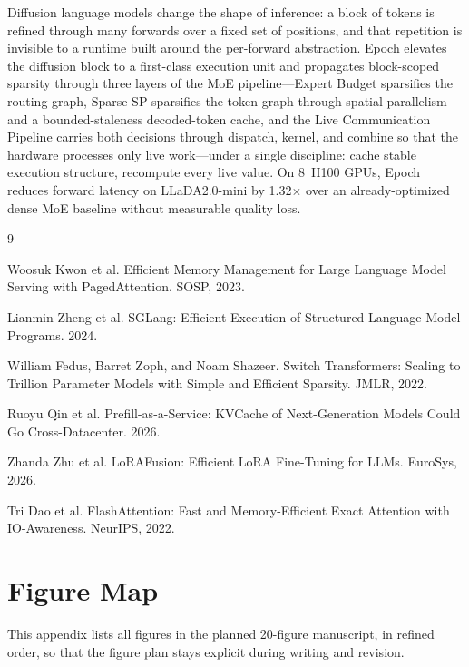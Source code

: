 \documentclass[sigconf,review,anonymous, 10pt]{acmart}
\newcommand{\sys}{Epoch}
\begin{document}
Diffusion language models change the shape of inference: a block of tokens is refined through many forwards over a fixed set of positions, and that repetition is invisible to a runtime built around the per-forward abstraction.
\sys{} elevates the diffusion block to a first-class execution unit and propagates block-scoped sparsity through three layers of the MoE pipeline---Expert Budget sparsifies the routing graph, Sparse-SP sparsifies the token graph through spatial parallelism and a bounded-staleness decoded-token cache, and the Live Communication Pipeline carries both decisions through dispatch, kernel, and combine so that the hardware processes only live work---under a single discipline: cache stable execution structure, recompute every live value.
On 8~H100 GPUs, \sys{} reduces forward latency on LLaDA2.0-mini by 1.32$\times$ over an already-optimized dense MoE baseline without measurable quality loss.

\balance

\begin{thebibliography}{9}

Woosuk Kwon et al.
Efficient Memory Management for Large Language Model Serving with PagedAttention.
SOSP, 2023.

Lianmin Zheng et al.
SGLang: Efficient Execution of Structured Language Model Programs.
2024.

William Fedus, Barret Zoph, and Noam Shazeer.
Switch Transformers: Scaling to Trillion Parameter Models with Simple and Efficient Sparsity.
JMLR, 2022.

Ruoyu Qin et al.
Prefill-as-a-Service: KVCache of Next-Generation Models Could Go Cross-Datacenter.
2026.

Zhanda Zhu et al.
LoRAFusion: Efficient LoRA Fine-Tuning for LLMs.
EuroSys, 2026.

Tri Dao et al.
FlashAttention: Fast and Memory-Efficient Exact Attention with IO-Awareness.
NeurIPS, 2022.

\end{thebibliography}

\appendix
\section{Figure Map}

This appendix lists all figures in the planned 20-figure manuscript, in refined order, so that the figure plan stays explicit during writing and revision.
\end{document}
